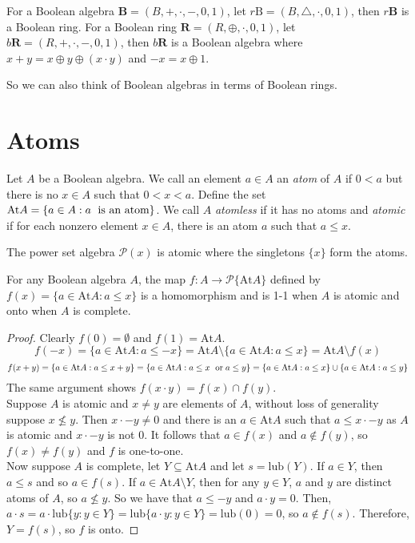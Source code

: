 \documentclass[12pt]{article}
\begin{document}
\begin{theorem}
For a Boolean algebra $\textbf{B}=(B,+,\cdot,-,0,1)$, let $r\text{B}=(B,\triangle,\cdot,0,1)$, then $r\textbf{B}$ is a Boolean ring.
For a Boolean ring $\textbf{R}=(R,\oplus,\cdot,0,1)$, let $b\textbf{R}=(R,+,\cdot,-,0,1)$, then $b\textbf{R}$ is a Boolean algebra where $x+y=x\oplus y\oplus(x\cdot y)$ and $-x=x\oplus 1$.
\end{theorem}
So we can also think of Boolean algebras in terms of Boolean rings.

\section{Atoms}

\begin{definition}
Let $A$ be a Boolean algebra. We call an element $a\in A$ an \textit{atom} of $A$ if $0<a$ but there is no $x\in A$ such that $0<x<a$. Define the set $\text{At} A=\{a\in A:a\text{\; is an atom}\}$. We call $A$ \textit{atomless} if it has no atoms and \textit{atomic} if for each nonzero element $x\in A$, there is an atom $a$ such that $a\le x$.
\end{definition}

\begin{example}
The power set algebra $\mathcal{P}(x)$ is atomic where the singletons $\{x\}$ form the atoms.
\end{example}

\begin{theorem}
For any Boolean algebra $A$, the map $f:A\to \mathcal{P}\{\text{At}A\}$ defined by $f(x)=\{a\in \text{At}A : a\le x\}$ is a homomorphism and is 1-1 when $A$ is atomic and onto when $A$ is complete.
\end{theorem}

\begin{proof}
Clearly $f(0)=\emptyset$ and $f(1)=\text{At}A$.
\[
f(-x)=\{a\in \text{At}A:a\le -x\}=\text{At}A\setminus\{a\in \text{At}A:a\le x\}=\text{At}A\setminus f(x)
\]
\[
f(x+y)=\{a\in\text{At}A:a\le x+y\}=\{a\in\text{At}A:a\le x \text{\; or\;} a\le y\} =\{a\in\text{At}A:a\le x\}\cup\{a\in\text{At}A:a\le y\}
\]
The same argument shows $f(x\cdot y)=f(x)\cap f(y)$.\\
Suppose $A$ is atomic and $x\neq y$ are elements of $A$, without loss of generality suppose $x\not\le y$.
Then $x\cdot -y\neq 0$ and there is an $a\in \text{At}A$ such that $a\le x\cdot -y$ as $A$ is atomic and $x\cdot -y$ is not 0.
It follows that $a\in f(x)$ and $a\not\in f(y)$, so $f(x)\neq f(y)$ and $f$ is one-to-one.\\
Now suppose $A$ is complete, let $Y\subseteq \text{At}A$ and let $s=\text{lub}(Y)$.
If $a\in Y$, then $a\le s$ and so $a\in f(s)$. 
If $a\in \text{At}A\setminus Y$, then for any $y\in Y$, $a$ and $y$ are distinct atoms of $A$, so $a\not\le y$.
So we have that $a\le -y$ and $a\cdot y=0$.
Then, $a\cdot s=a\cdot \text{lub}\{y:y\in Y\}=\text{lub}\{a\cdot y:y\in Y\}=\text{lub}(0)=0$, so $a\not\in f(s)$.
Therefore, $Y=f(s)$, so $f$ is onto.
\end{proof}
\end{document}
